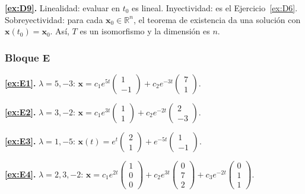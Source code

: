 \noindent\textbf{\ref{ex:D9}.} Linealidad: evaluar en $t_0$ es lineal. Inyectividad: es el Ejercicio~\ref{ex:D6}. Sobreyectividad: para cada $\mathbf{x}_0 \in \mathbb{R}^n$, el teorema de existencia da una solución con $\mathbf{x}(t_0) = \mathbf{x}_0$. Así, $T$ es un isomorfismo y la dimensión es $n$.

\subsubsection*{Bloque E}
\noindent\textbf{\ref{ex:E1}.} $\lambda = 5, -3$: \; $\mathbf{x} = c_1e^{5t}\begin{pmatrix}1\\-1\end{pmatrix} + c_2e^{-3t}\begin{pmatrix}7\\1\end{pmatrix}$.

\noindent\textbf{\ref{ex:E2}.} $\lambda = 3, -2$: \; $\mathbf{x} = c_1e^{3t}\begin{pmatrix}1\\1\end{pmatrix} + c_2e^{-2t}\begin{pmatrix}2\\-3\end{pmatrix}$.

\noindent\textbf{\ref{ex:E3}.} $\lambda = 1, -5$: \; $\mathbf{x}(t) = e^{t}\begin{pmatrix}2\\1\end{pmatrix} + e^{-5t}\begin{pmatrix}1\\-1\end{pmatrix}$.

\noindent\textbf{\ref{ex:E4}.} $\lambda = 2, 3, -2$: \; $\mathbf{x} = c_1e^{2t}\begin{pmatrix}1\\0\\0\end{pmatrix} + c_2e^{3t}\begin{pmatrix}0\\7\\2\end{pmatrix} + c_3e^{-2t}\begin{pmatrix}0\\1\\1\end{pmatrix}$.

